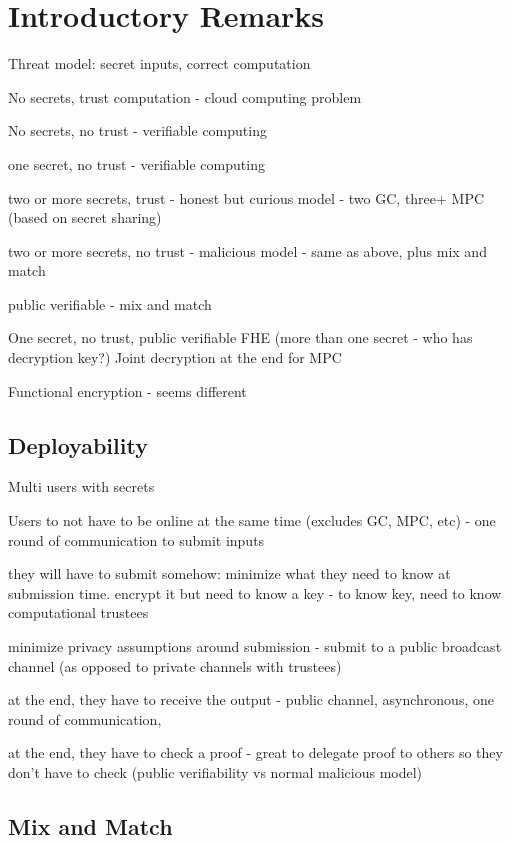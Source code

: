 \section{Introductory Remarks}

Threat model: secret inputs, correct computation


No secrets, trust computation
- cloud computing problem

No secrets, no trust
- verifiable computing

one secret, no trust
- verifiable computing

two or more secrets, trust
- honest but curious model - two GC, three+ MPC (based on secret sharing)

two or more secrets, no trust
- malicious model - same as above, plus mix and match 

public verifiable
- mix and match 

One secret, no trust, public verifiable 
FHE (more than one secret - who has decryption key?) 
Joint decryption at the end for MPC

Functional encryption
- seems different

\subsection{Deployability}

Multi users with secrets

Users to not have to be online at the same time (excludes GC, MPC, etc) - one round of communication to submit inputs

they will have to submit somehow: minimize what they need to know at submission time. encrypt it but need to know a key - to know key, need to know computational trustees

minimize privacy assumptions around submission - submit to a public broadcast channel (as opposed to private channels with trustees) 

at the end, they have to receive the output - public channel, asynchronous, one round of communication, 

at the end, they have to check a proof - great to delegate proof to others so they don't have to check (public verifiability vs normal malicious model)

\subsection{Mix and Match}

